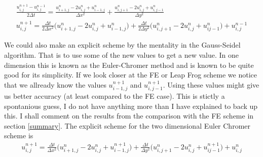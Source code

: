 \documentclass[a4paper,english, 10pt, twoside]{article}
\begin{document}
\begin{align*}
 \frac{u^{n+1}_{i,j}-u^{n-1}_{i,j}}{2\Delta t} = \frac{u^n_{i+1,j}-2u^n_{i,j} + u^n_{i-1,j}}{\Delta x^2}+ 
 \frac{u^n_{i,j+1}-2u^n_{i,j} + u^n_{i,j-1}}{\Delta y^2}\\
  u^{n+1}_{i,j} = \frac{\Delta t}{2\Delta x^2}\big(u^n_{i+1,j}-2u^n_{i,j} + u^n_{i-1,j}\big) + 
 \frac{\Delta t}{2\Delta y^2}\big(u^n_{i,j+1}-2u^n_{i,j} + u^n_{ij-1}\big) + u^{n-1}_{i,j}
\end{align*}

We could also make an explicit scheme by the mentality in the Gauss-Seidel algorithm. That is to use some of the new values to get 
a new value. In one dimension this is known as the Euler-Chromer method and is known to be quite good for its simplicity. If we 
look closer at the FE or Leap Frog scheme we notice that we allready know the values $u^{n+1}_{i-1,j}$ and $u^{n+1}_{i,j-1}$. 
Using these values might give us better accuracy (at least compared to the FE case). This is stictly a spontanious guess, I do not have anything 
more than I have explained to back up this. I shall comment on the results from the comparison with the FE scheme in section \ref{summary}. The 
explicit scheme for the two dimensional Euler Chromer scheme is
\begin{align*}
 u^{n+1}_{i,j} = \frac{\Delta t}{\Delta x^2}\big(u^n_{i+1,j}-2u^n_{i,j} + u^{n+1}_{i-1,j}\big) + 
 \frac{\Delta t}{\Delta y^2}\big(u^n_{i,j+1}-2u^n_{i,j} + u^{n+1}_{ij-1}\big) + u^n_{i,j}
\end{align*}
\end{document}
